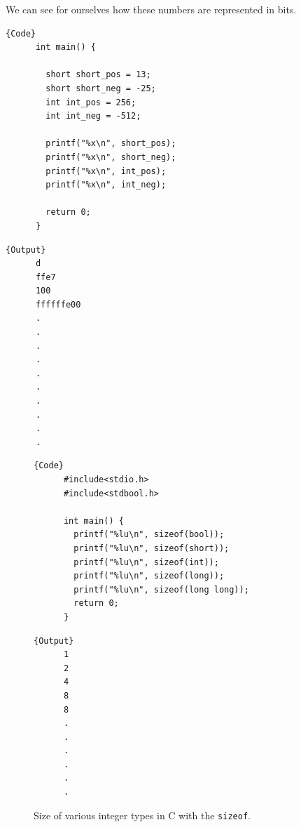   \begin{example}
    We can see for ourselves how these numbers are represented in bits. 

    \noindent\begin{minipage}{.5\textwidth}
    \begin{lstlisting}[]{Code}
      int main() { 

        short short_pos = 13; 
        short short_neg = -25; 
        int int_pos = 256;
        int int_neg = -512; 

        printf("%x\n", short_pos);
        printf("%x\n", short_neg);
        printf("%x\n", int_pos);
        printf("%x\n", int_neg);

        return 0; 
      }
    \end{lstlisting}
    \end{minipage}
    \hfill
    \begin{minipage}{.49\textwidth}
    \begin{lstlisting}[]{Output}
      d
      ffe7
      100
      ffffffe00
      .
      .
      .
      .
      .
      .
      .
      .
      .
      .
    \end{lstlisting}
    \end{minipage}
  \end{example}

  \begin{figure}[H]
    \centering 
    \noindent\begin{minipage}{.5\textwidth}
    \begin{lstlisting}[]{Code}
      #include<stdio.h>
      #include<stdbool.h>

      int main() {
        printf("%lu\n", sizeof(bool)); 
        printf("%lu\n", sizeof(short)); 
        printf("%lu\n", sizeof(int)); 
        printf("%lu\n", sizeof(long)); 
        printf("%lu\n", sizeof(long long)); 
        return 0; 
      }
    \end{lstlisting}
    \end{minipage}
    \hfill
    \begin{minipage}{.49\textwidth}
    \begin{lstlisting}[]{Output}
      1
      2
      4
      8
      8
      .
      .
      .
      .
      .
      .
    \end{lstlisting}
    \end{minipage}
    \caption{Size of various integer types in C with the \texttt{sizeof}.} 
    \label{fig:integer_size}
  \end{figure}


